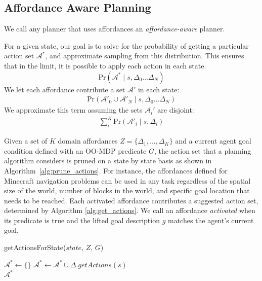\documentclass[conference]{IEEEtran}
\begin{document}
\subsection{Affordance Aware Planning}
We call any planner that
uses affordances an {\it affordance-aware} planner.

For a given state, our goal is to solve for the probability of getting a particular action set $\mathcal{A}^*$, and approximate sampling
from this distribution. This ensures that in the limit, it is possible to apply each action in each state.
\begin{equation}
\text{Pr}(\mathcal{A}^* \mid s, \Delta_0 \dots \Delta_N)
\end{equation}
We let each affordance contribute a set $\mathcal{A}'$ in each state:
\begin{align}
\text{Pr}(\mathcal{A}'_0 \cup \mathcal{A}'_N \mid s, \Delta_0 \dots \Delta_N)
\end{align}
We approximate this term assuming the sets $\mathcal{A}_i'$ are disjoint:
\begin{align}
\sum_i^K \text{Pr}(\mathcal{A}'_i \mid s, \Delta_i)
\end{align}

Given a set of $K$ domain affordances $Z = \{\Delta_1, ..., \Delta_K\}$ and a current 
agent goal condition defined with an OO-MDP predicate $G$, the action set that a 
planning algorithm considers is pruned on a state by state basis as shown in 
Algorithm~\ref{alg:prune_actions}. For instance, the affordances defined for Minecraft 
navigation problems can be used in any task regardless of the spatial size of the world, 
number of blocks in the world, and specific goal location that needs to be reached. Each 
activated affordance contributes a suggested action set, determined by Algorithm \ref{alg:get_actions}. 
We call an affordance {\it activated} when its predicate is true and the lifted goal description $g$ matches the agent's current goal.

\begin{algorithm}
  \caption{getActionsForState($state$, $Z$, $G$)}
  \begin{algorithmic}[1]
    \State $\mathcal{A}^* \leftarrow \{\}$
    \State $\mathcal{A}^* \leftarrow \mathcal{A}^* \cup \Delta.getActions(s)$
    \EndIf
    \EndFor \\
    \Return $\mathcal{A}^*$
  \end{algorithmic}
  \label{alg:prune_actions}
\end{algorithm}
\end{document}
